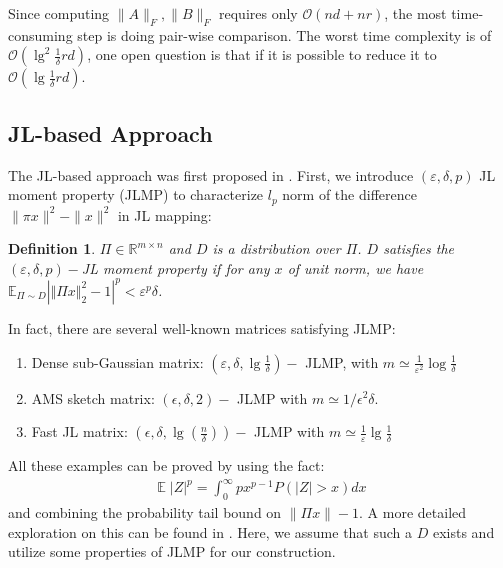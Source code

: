 \documentclass[11pt]{article}
\DeclareMathOperator*{\E}{\mathbb{E}}
\newtheorem{definition}[theorem]{Definition}
\begin{document}
Since computing $\|A\|_F,\|B\|_F$ requires only $\mathcal{O}(nd+nr)$, the most time-consuming step is doing pair-wise comparison. The worst time complexity is of $\mathcal{O}(\lg^2\frac{1}{\delta}rd)$, one open question is that if it is possible to reduce it to $\mathcal{O}(\lg\frac{1}{\delta}rd)$.
\subsection{JL-based Approach}
The JL-based approach was first proposed in \cite{Sarlos}. First, we introduce $(\varepsilon, \delta, p)$ JL moment property (JLMP) to characterize $l_p$ norm of the difference $\|\pi x\|^2 - \|x\|^2$ in JL mapping:
\begin{definition}
$\Pi\in\mathbb{R}^{m\times n}$ and $D$ is a distribution over $\Pi$. $D$ satisfies the $(\varepsilon,\delta, p)-$JL moment property if for any $x$ of unit norm, we have $\mathbb{E}_{\Pi\sim D}|\Vert \Pi x\Vert_2^2-1|^p<\varepsilon^p\delta$.
\end{definition}
In fact, there are several well-known matrices satisfying JLMP:
\begin{enumerate}
\item
Dense sub-Gaussian matrix: $(\varepsilon,\delta,\lg\frac{1}{\delta})-$ JLMP, with $m\simeq \frac{1}{\varepsilon^2}\log\frac{1}{\delta}$
\item
AMS sketch matrix: $(\epsilon, \delta, 2)-$ JLMP with $m\simeq 1/\epsilon^2\delta$.
\item
Fast JL matrix: $(\epsilon, \delta, \lg(\frac{n}{\delta}))-$ JLMP with $m\simeq \frac{1}{\varepsilon}\lg \frac{1}{\delta}$
\end{enumerate}
All these examples can be proved by using the fact:
\begin{align}
\label{eq:expectationasprob}
\E |Z|^p = \int_0^\infty p x^{p-1}P(|Z|>x)dx
\end{align}
and combining the probability tail bound on $\|\Pi x\|-1$. A more detailed exploration on this can be found in \cite{BellareR94}. Here, we assume that such a $D$ exists and utilize some properties of JLMP for our construction.
\end{document}
